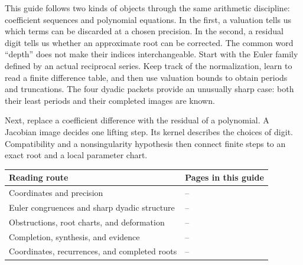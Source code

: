 This guide follows two kinds of objects through the same arithmetic discipline: coefficient sequences and polynomial equations. In the first, a valuation tells us which terms can be discarded at a chosen precision. In the second, a residual digit tells us whether an approximate root can be corrected. The common word ``depth'' does not make their indices interchangeable.
Start with the Euler family defined by an actual reciprocal series. Keep track of the normalization, learn to read a finite difference table, and then use valuation bounds to obtain periods and truncations. The four dyadic packets provide an unusually sharp case: both their least periods and their completed images are known.

Next, replace a coefficient difference with the residual of a polynomial. A Jacobian image decides one lifting step. Its kernel describes the choices of digit. Compatibility and a nonsingularity hypothesis then connect finite steps to an exact root and a local parameter chart.
\par
\begin{tabularx}{\linewidth}{@{}lY@{}}\toprule
Reading route & Pages in this guide\\\midrule
Coordinates and precision & --\\
Euler congruences and sharp dyadic structure & --\\
Obstructions, root charts, and deformation & --\\
Completion, synthesis, and evidence & --\\
Coordinates, recurrences, and completed roots & --\\\bottomrule
\end{tabularx}
\par
{}

